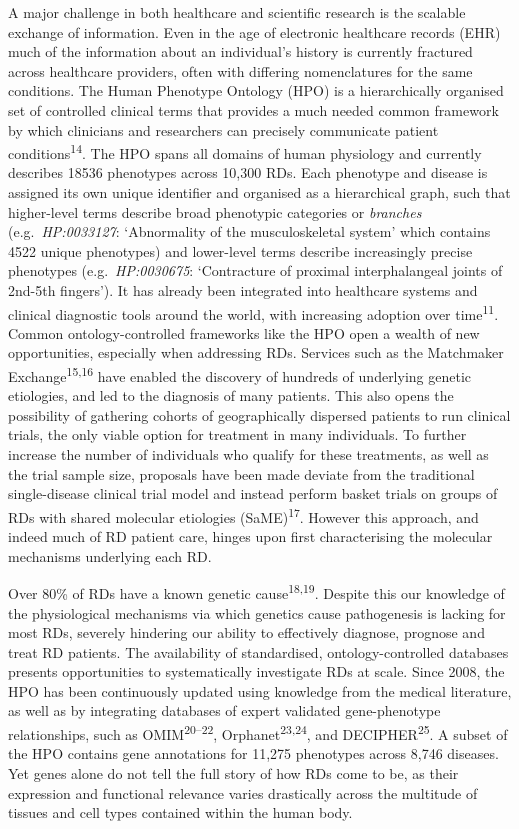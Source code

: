 \documentclass[
]{agujournal2019}
\begin{document}
A major challenge in both healthcare and scientific research is the
scalable exchange of information. Even in the age of electronic
healthcare records (EHR) much of the information about an individual's
history is currently fractured across healthcare providers, often with
differing nomenclatures for the same conditions. The Human Phenotype
Ontology (HPO) is a hierarchically organised set of controlled clinical
terms that provides a much needed common framework by which clinicians
and researchers can precisely communicate patient
conditions\textsuperscript{14}. The HPO spans all domains of human
physiology and currently describes 18536 phenotypes across 10,300 RDs.
Each phenotype and disease is assigned its own unique identifier and
organised as a hierarchical graph, such that higher-level terms describe
broad phenotypic categories or \emph{branches} (e.g.~\emph{HP:0033127}:
`Abnormality of the musculoskeletal system' which contains 4522 unique
phenotypes) and lower-level terms describe increasingly precise
phenotypes (e.g.~\emph{HP:0030675}: `Contracture of proximal
interphalangeal joints of 2nd-5th fingers'). It has already been
integrated into healthcare systems and clinical diagnostic tools around
the world, with increasing adoption over time\textsuperscript{11}.
Common ontology-controlled frameworks like the HPO open a wealth of new
opportunities, especially when addressing RDs. Services such as the
Matchmaker Exchange\textsuperscript{15,16} have enabled the discovery of
hundreds of underlying genetic etiologies, and led to the diagnosis of
many patients. This also opens the possibility of gathering cohorts of
geographically dispersed patients to run clinical trials, the only
viable option for treatment in many individuals. To further increase the
number of individuals who qualify for these treatments, as well as the
trial sample size, proposals have been made deviate from the traditional
single-disease clinical trial model and instead perform basket trials on
groups of RDs with shared molecular etiologies
(SaME)\textsuperscript{17}. However this approach, and indeed much of RD
patient care, hinges upon first characterising the molecular mechanisms
underlying each RD.

Over 80\% of RDs have a known genetic cause\textsuperscript{18,19}.
Despite this our knowledge of the physiological mechanisms via which
genetics cause pathogenesis is lacking for most RDs, severely hindering
our ability to effectively diagnose, prognose and treat RD patients. The
availability of standardised, ontology-controlled databases presents
opportunities to systematically investigate RDs at scale. Since 2008,
the HPO has been continuously updated using knowledge from the medical
literature, as well as by integrating databases of expert validated
gene-phenotype relationships, such as OMIM\textsuperscript{20--22},
Orphanet\textsuperscript{23,24}, and DECIPHER\textsuperscript{25}. A
subset of the HPO contains gene annotations for 11,275 phenotypes across
8,746 diseases. Yet genes alone do not tell the full story of how RDs
come to be, as their expression and functional relevance varies
drastically across the multitude of tissues and cell types contained
within the human body.
\end{document}
